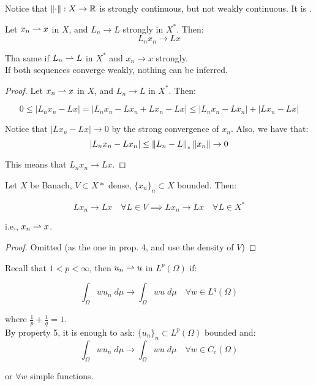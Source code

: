 \begin{fremark}
    Notice that $\left\|\cdot\right\|: X \to \mathbb{R}$ is strongly continuous, but not weakly
    continuous. It is .
\end{fremark}

\begin{fproposition}
    Let $x_n \rightharpoonup x$ in $X$, and $L_n \to L$ strongly in $X^*$. Then:
    $$L_n x_n \to L x$$

    Tha same if $L_n \rightharpoonup L$ in $X^*$ and $x_n \to x$ strongly.\\

    If both sequences converge weakly, nothing can be inferred.
\end{fproposition}

\begin{proof}
    Let $x_n \rightharpoonup x$ in $X$, and $L_n \to L$ in $X^*$. Then:

    $$0 \leq |L_n x_n - Lx| = |L_n x_n - Lx_n + Lx_n - Lx| \leq |L_n x_n - Lx_n| + |Lx_n - Lx|$$

    Notice that $|Lx_n - Lx| \to 0$ by the strong convergence of $x_n$. Also, we
    have that:
    $$|L_n x_n - Lx_n| \leq \left\|L_n - L\right\|_* \left\|x_n\right\| \to 0$$

    This means that $L_n x_n \to Lx$.
\end{proof}

\begin{fproposition}
    Let $X$ be Banach, $V \subset X*$ dense, $\{x_n\}_n \subset X$ bounded. 
    Then:

    $$Lx_n \to Lx \quad \forall L \in V \implies Lx_n \to Lx \quad \forall L \in X^*$$

    i.e., $x_n \rightharpoonup x$.

\end{fproposition}

\begin{proof}
    Omitted (as the one in prop. 4, and use the density of $V$)
\end{proof}

\begin{fexample}
    Recall that $1 < p < \infty$, then $u_n \rightharpoonup u$ in $L^p(\Omega)$ if:

    $$\int_\Omega w u_n \; d\mu \to \int_\Omega w u \; d\mu \quad \forall w \in L^q(\Omega)$$

    where $\frac{1}{p} + \frac{1}{q} = 1$.\\

    By property 5, it is enough to ask: $\{u_n\}_n \subset L^p(\Omega)$ bounded and:
    $$\int_{\Omega} w u_n \; d\mu \to \int_{\Omega} w u \; d\mu \quad \forall w \in C_c(\Omega)$$

    or $\forall w$ simple functions.
\end{fexample}

